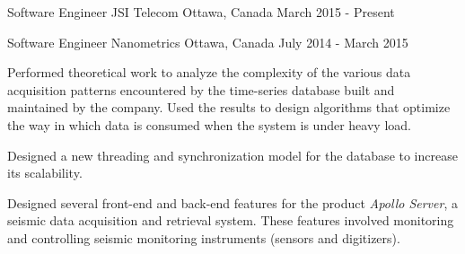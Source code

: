 


\begin{cventries}


\cventry
{Software Engineer} %
{JSI Telecom} %
{Ottawa, Canada} %
{March 2015 - Present} %
{ %
\begin{cvitems}
\item {}
\end{cvitems}
}


\cventry
{Software Engineer} %
{Nanometrics} %
{Ottawa, Canada} %
{July 2014 - March 2015} %
{ %
\begin{cvitems}
\item {Performed theoretical work to analyze the complexity of the various data acquisition patterns encountered by the time-series database built and maintained by the company. Used the results to design algorithms that optimize the way in which data is consumed when the system is under heavy load.}
\item {Designed a new threading and synchronization model for the database to increase its scalability.}
\item {Designed several front-end and back-end features for the product \emph{Apollo Server}, a seismic data acquisition and retrieval system. These features involved monitoring and controlling seismic monitoring instruments (sensors and digitizers).}
\end{cvitems}
}



\end{cventries}
